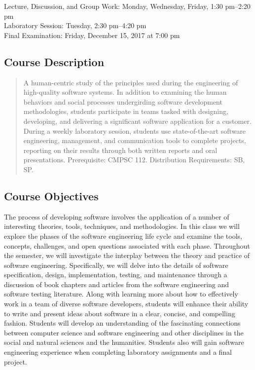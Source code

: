 \documentclass[11pt]{article}
\begin{document}
Lecture, Discussion, and Group Work: Monday, Wednesday, Friday, 1:30 pm--2:20 pm \\
Laboratory Session: Tuesday, 2:30 pm--4:20 pm \\
Final Examination: Friday, December 15, 2017 at 7:00 pm

\subsection*{Course Description}

\begin{quote}

  A human-centric study of the principles used during the engineering of high-quality software systems. In addition to
  examining the human behaviors and social processes undergirding software development methodologies, students participate
  in teams tasked with designing, developing, and delivering a significant software application for a customer. During a
  weekly laboratory session, students use state-of-the-art software engineering, management, and communication tools to
  complete projects, reporting on their results through both written reports and oral presentations. Prerequisite: CMPSC
  112. Distribution Requirements: SB, SP.

\end{quote}

\subsection*{Course Objectives}

The process of developing software involves the application of a number of interesting theories, tools, techniques, and
methodologies. In this class we will explore the phases of the software engineering life cycle and examine the tools,
concepts, challenges, and open questions associated with each phase. Throughout the semester, we will investigate the
interplay between the theory and practice of software engineering. Specifically, we will delve into the details of
software specification, design, implementation, testing, and maintenance through a discussion of book chapters and
articles from the software engineering and software testing literature. Along with learning more about how to
effectively work in a team of diverse software developers, students will enhance their ability to write and present
ideas about software in a clear, concise, and compelling fashion. Students will develop an understanding of the
fascinating connections between computer science and software engineering and other disciplines in the social and
natural sciences and the humanities. Students also will gain software engineering experience when completing laboratory
assignments and a final project.
\end{document}
